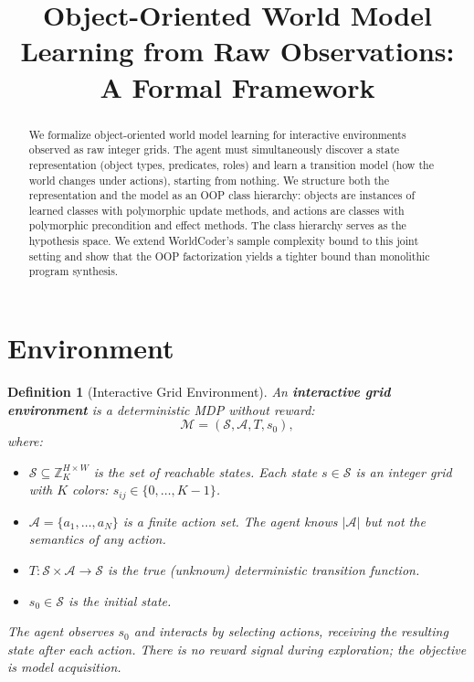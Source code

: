 \documentclass{article}
\title{Object-Oriented World Model Learning from Raw Observations:\\A Formal Framework}
\author{}
\newtheorem{definition}{Definition}
\newcommand{\calS}{\mathcal{S}}
\newcommand{\calA}{\mathcal{A}}
\newcommand{\calM}{\mathcal{M}}
\newcommand{\bbZ}{\mathbb{Z}}
\begin{document}
\maketitle

\begin{abstract}
We formalize object-oriented world model learning for interactive environments
observed as raw integer grids.  The agent must simultaneously discover a state
representation (object types, predicates, roles) and learn a transition model
(how the world changes under actions), starting from nothing.  We structure
both the representation and the model as an OOP class hierarchy: objects are
instances of learned classes with polymorphic update methods, and actions are
classes with polymorphic precondition and effect methods.  The class hierarchy
serves as the hypothesis space.  We extend WorldCoder's sample complexity
bound to this joint setting and show that the OOP factorization yields a
tighter bound than monolithic program synthesis.
\end{abstract}



\section{Environment}
\label{sec:environment}

\begin{definition}[Interactive Grid Environment]
\label{def:env}
An \textbf{interactive grid environment} is a deterministic MDP without reward:
\begin{equation}
\calM = (\calS, \calA, T, s_0),
\end{equation}
where:
\begin{itemize}[nosep]
    \item $\calS \subseteq \bbZ_K^{H \times W}$ is the set of reachable states.
          Each state $s \in \calS$ is an integer grid with $K$ colors:
          $s_{ij} \in \{0, \ldots, K{-}1\}$.
    \item $\calA = \{a_1, \ldots, a_N\}$ is a finite action set.  The agent
          knows $|\calA|$ but not the semantics of any action.
    \item $T : \calS \times \calA \to \calS$ is the true (unknown) deterministic
          transition function.
    \item $s_0 \in \calS$ is the initial state.
\end{itemize}
The agent observes $s_0$ and interacts by selecting actions, receiving the
resulting state after each action.  There is no reward signal during
exploration; the objective is model acquisition.
\end{definition}
\end{document}
